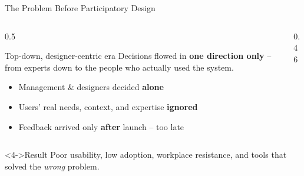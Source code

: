 \documentclass[aspectratio=169,10pt]{beamer}
\begin{document}
\begin{frame}{The Problem Before Participatory Design}
  \begin{columns}[T,onlytextwidth]
    \begin{column}{0.5\textwidth}
      \begin{alertblock}{Top-down, designer-centric era}
        \small Decisions flowed in \textbf{one direction only} -- from
        experts down to the people who actually used the system.
      \end{alertblock}
      \begin{itemize}
        \item<1-> Management \& designers decided \textbf{alone}
        \item<2-> Users' real needs, context, and expertise \textbf{ignored}
        \item<3-> Feedback arrived only \textbf{after} launch -- too late
      \end{itemize}
    \end{column}
    \begin{column}{0.46\textwidth}
      \centering
    \end{column}
  \end{columns}
  \vspace{4pt}
  \begin{block}<4->{\small Result}
    \footnotesize Poor usability, low adoption, workplace resistance, and
    tools that solved the \textit{wrong} problem.
  \end{block}
\end{frame}
\end{document}
